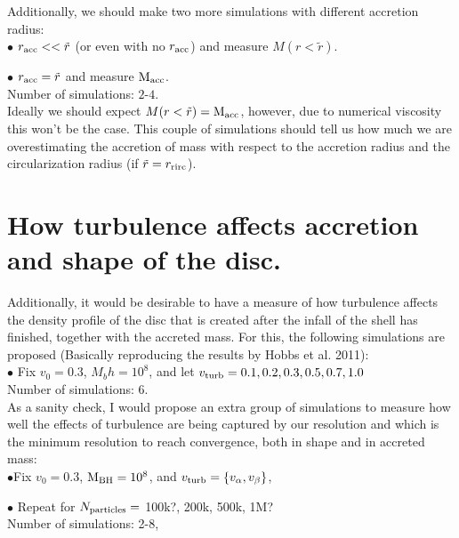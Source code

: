 \documentclass[11pt]{article} %
\def\mbh{{\rm M_{\rm BH}}}
\def\macc{{\rm M_{\rm acc}}}
\def\vturb{ v_{\rm turb} }
\def\rcirc{r_{\rm rirc}}
\def\racc{r_{\rm acc}}
\begin{document}
\noindent Additionally, we should make two more simulations with different accretion radius: \\

$\bullet$ $\racc << \tilde{r}$ (or even with no $\racc$) and measure $M(r<\tilde{r})$.

$\bullet$ $\racc = \tilde{r}$ and measure $\macc$.\\

Number of simulations: $2$-$4$.\\

\noindent Ideally we should expect $M(r<\tilde{r}) = \macc$, however, due to numerical viscosity this won't be the case. This couple of simulations should tell us how much we are overestimating the accretion of mass with respect to the accretion radius and the circularization radius (if $\tilde{r}  = \rcirc$).\\



\section{How turbulence affects accretion and shape of the disc.}

Additionally, it would be desirable to have a measure of how turbulence affects the density profile of the disc that is created after the infall of the shell has finished, together with the accreted mass. For this, the following simulations are proposed (Basically reproducing the results by Hobbs et al. 2011):\\

$\bullet$ Fix $v_0 = 0.3$, $M_bh = 10^8$, and let $\vturb = {0.1, 0.2, 0.3, 0.5, 0.7, 1.0}$\\
	
Number of simulations: $6$.\\

\noindent As a sanity check, I would propose an extra group of simulations to measure how well the effects of turbulence are being captured by our resolution and which is the minimum resolution to reach convergence, both in shape and in accreted mass:\\

$\bullet $Fix $v_0 = 0.3$, $\mbh = 10^8$, and $\vturb = \{ v_{\alpha}, v_{\beta} \}$, 

$\bullet$ Repeat for $N_{\rm particles} =$ 100k?, 200k, 500k, 1M?\\

Number of simulations: 2-8,\\
\end{document}
